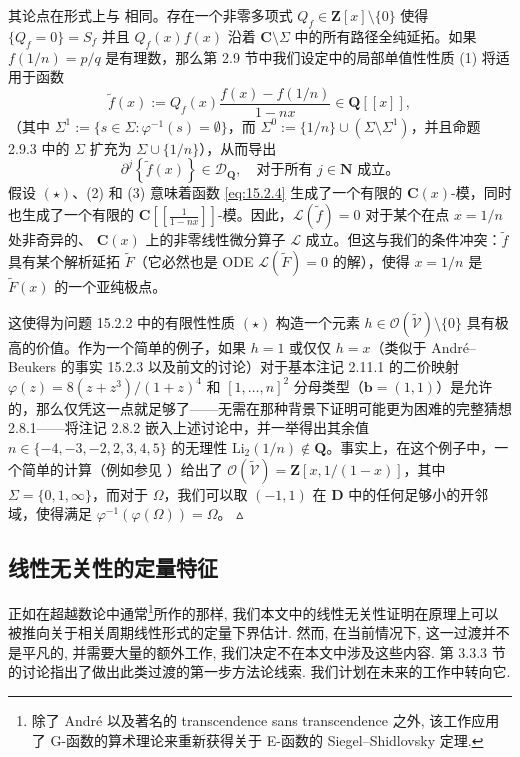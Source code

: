 其论点在形式上与 \cite{Beu06} 相同。存在一个非零多项式 \(Q_f \in \mathbf{Z}[x] \setminus \{0\}\) 使得 \(\{Q_f = 0\} = S_f\) 并且 \(Q_f(x)f(x)\) 沿着 \(\mathbf{C} \setminus \Sigma\) 中的所有路径全纯延拓。如果 \(f(1/n) = p/q\) 是有理数，那么第 2.9 节中我们设定中的局部单值性性质 (1) 将适用于函数
\[ \widetilde{f}(x) := Q_f(x) \frac{f(x) - f(1/n)}{1 - nx} \in \mathbf{Q}[\![x]\!], \]
（其中 \(\Sigma^1 := \{s \in \Sigma : \varphi^{-1}(s) = \emptyset\}\)，而 \(\Sigma^0 := \{1/n\} \cup (\Sigma \setminus \Sigma^1)\)，并且命题 2.9.3 中的 \(\Sigma\) 扩充为 \(\Sigma \cup \{1/n\}\)），从而导出
\begin{equation}\label{eq:15.2.4}
\partial^{j}\left\{\widetilde{f}(x)\right\} \in \mathcal{D}_{\mathbf{Q}}, \quad \text{对于所有 } j \in \mathbf{N} \text{ 成立。}
\end{equation}
假设 \((\star)\)、(2) 和 (3) 意味着函数 \eqref{eq:15.2.4} 生成了一个有限的 \(\mathbf{C}(x)\)-模，同时也生成了一个有限的 \(\mathbf{C}[\![\frac{1}{1-nx}]\!]\)-模。因此，\(\mathcal{L}(\widetilde{f})=0\) 对于某个在点 \(x=1/n\) 处非奇异的、 \(\mathbf{C}(x)\) 上的非零线性微分算子 \(\mathcal{L}\) 成立。但这与我们的条件冲突：\(\widetilde{f}\) 具有某个解析延拓 \(\widetilde{F}\)（它必然也是 ODE \(\mathcal{L}(\widetilde{F})=0\) 的解），使得 \(x=1/n\) 是 \(\widetilde{F}(x)\) 的一个亚纯极点。

这使得为问题 15.2.2 中的有限性性质 \((\star)\) 构造一个元素 \(h \in \mathcal{O}(\widetilde{\mathcal{V}}) \setminus \{0\}\) 具有极高的价值。作为一个简单的例子，如果 \(h=1\) 或仅仅 \(h=x\)（类似于 Andr{\'e}--Beukers 的事实 15.2.3 以及前文的讨论）对于基本注记 2.11.1 的二价映射 \(\varphi(z) = 8(z+z^3)/(1+z)^4\) 和 \([1,\ldots,n]^2\) 分母类型（\(\mathbf{b}=(1,1)\)）是允许的，那么仅凭这一点就足够了——无需在那种背景下证明可能更为困难的完整猜想 2.8.1——将注记 2.8.2 嵌入上述讨论中，并一举得出其余值 \(n \in \{-4, -3, -2, 2, 3, 4, 5\}\) 的无理性 \(\mathrm{Li}_2(1/n) \notin \mathbf{Q}\)。事实上，在这个例子中，一个简单的计算（例如参见 \cite{Rob68}）给出了 \(\mathcal{O}(\widetilde{\mathcal{V}}) = \mathbf{Z}[x, 1/(1-x)]\)，其中 \(\Sigma = \{0, 1, \infty\}\)，而对于 \(\Omega\)，我们可以取 \((-1, 1)\) 在 \(\mathbf{D}\) 中的任何足够小的开邻域，使得满足 \(\varphi^{-1}(\varphi(\Omega)) = \Omega\)。 \(\vartriangle\)

\subsection{线性无关性的定量特征}\label{sec:15.3}

正如在超越数论中通常\setcounter{footnote}{46}\footnote{除了 Andr{\'e} 以及著名的 transcendence sans transcendence \cite{And00a}\cite{And00b} 之外, 
该工作应用了 G-函数的算术理论来重新获得关于 E-函数的 Siegel--Shidlovsky 定理.}所作的那样, 
我们本文中的线性无关性证明在原理上可以被推向关于相关周期线性形式的定量下界估计. 
然而, 在当前情况下, 这一过渡并不是平凡的, 
并需要大量的额外工作, 我们决定不在本文中涉及这些内容. 
第 3.3.3 节的讨论指出了做出此类过渡的第一步方法论线索. 
我们计划在未来的工作中转向它.

